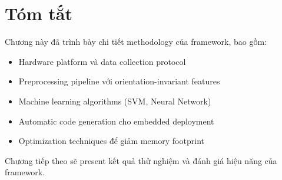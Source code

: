 \section{Tóm tắt}
Chương này đã trình bày chi tiết methodology của framework, bao gồm:
\begin{itemize}
    \item Hardware platform và data collection protocol
    \item Preprocessing pipeline với orientation-invariant features
    \item Machine learning algorithms (SVM, Neural Network)
    \item Automatic code generation cho embedded deployment
    \item Optimization techniques để giảm memory footprint
\end{itemize}

Chương tiếp theo sẽ present kết quả thử nghiệm và đánh giá hiệu năng của framework.

